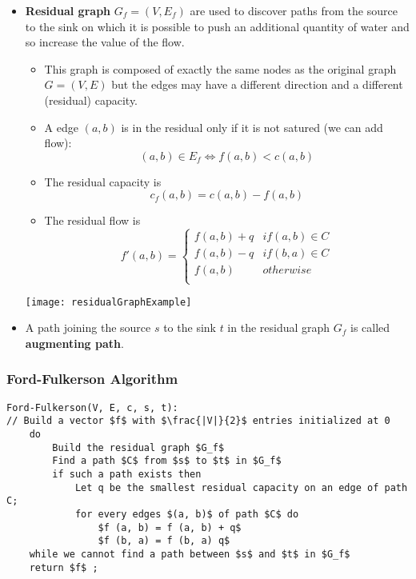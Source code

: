 \begin{itemize}
    \item \textbf{Residual graph} $G_f = (V, E_f)$ are used to discover paths from the
        source to the sink on which it is possible to push an
        additional quantity of water and so increase the value of the
        flow. 

        \begin{itemize}
            \item This graph is composed of exactly the same nodes as the
                original graph $G = (V, E)$ but the edges may have a different
                direction and a different (residual) capacity.

            \item A edge $(a, b)$ is in the residual only if it is not
                satured (we can add flow):
                $$(a, b) \in E_f \Leftrightarrow f(a, b) < c(a, b)$$

            \item The residual capacity is 
                $$c_f(a, b) = c(a, b) - f(a, b)$$

            \item The residual flow is
                $$f'(a, b) = \begin{cases}
                    f(a,b) + q & if (a, b) \in C\\
                    f(a,b) - q & if (b, a) \in C\\
                    f(a,b)  & otherwise\\
                \end{cases}$$
        \end{itemize}

        \begin{center}
            \texttt{[image: residualGraphExample]}
            \end{center}

    \item A path joining the source $s$ to the sink $t$ in the residual
        graph $G_f$ is called \textbf{augmenting path}.
\end{itemize}


\subsubsection{Ford-Fulkerson Algorithm}

\begin{lstlisting}[mathescape]
Ford-Fulkerson(V, E, c, s, t):
// Build a vector $f$ with $\frac{|V|}{2}$ entries initialized at 0
    do
        Build the residual graph $G_f$ 
        Find a path $C$ from $s$ to $t$ in $G_f$ 
        if such a path exists then
            Let q be the smallest residual capacity on an edge of path C;
            for every edges $(a, b)$ of path $C$ do
                $f (a, b) = f (a, b) + q$
                $f (b, a) = f (b, a) q$
    while we cannot find a path between $s$ and $t$ in $G_f$ 
    return $f$ ;
\end{lstlisting}

